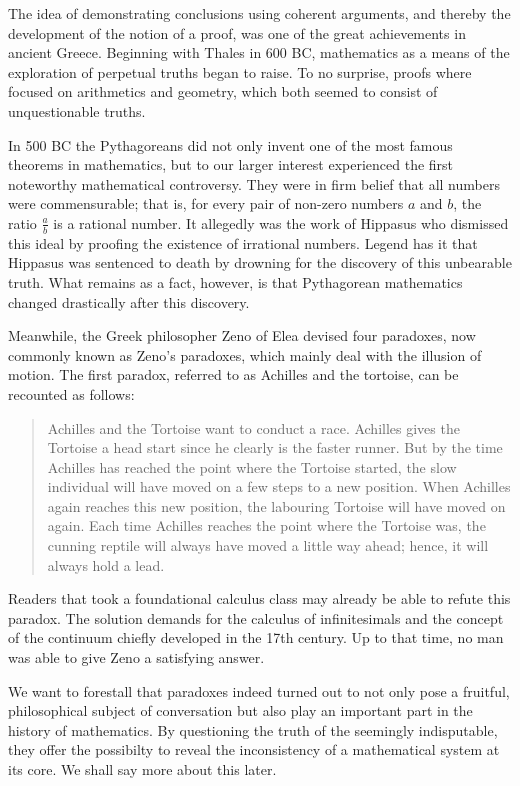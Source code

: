 \documentclass[hidelinks]{article}
\theoremstyle{plain}
\theoremstyle{definition}
\theoremstyle{rem}
\begin{document}
The idea of demonstrating conclusions using coherent arguments, and thereby the development of the notion of a proof, was one of the great achievements in ancient Greece.
Beginning with Thales in 600 BC, mathematics as a means of the exploration of perpetual truths began to raise. To no surprise, proofs where focused on arithmetics and geometry, which both seemed to consist of unquestionable truths.

In 500 BC the Pythagoreans did not only invent one of the most famous theorems in mathematics, but to our larger interest experienced the first noteworthy mathematical controversy. They were in firm belief that all numbers were commensurable; that is, for every pair of non-zero numbers $a$ and $b$, the ratio $\frac{a}{b}$ is a rational number. It allegedly was the work of Hippasus who dismissed this ideal by proofing the existence of irrational numbers. Legend has it that Hippasus was sentenced to death by drowning for the discovery of this unbearable truth. What remains as a fact, however, is that Pythagorean mathematics changed drastically after this discovery.

Meanwhile, the Greek philosopher Zeno of Elea devised four paradoxes, now commonly known as Zeno's paradoxes, which mainly deal with the illusion of motion. The first paradox, referred to as Achilles and the tortoise, can be recounted as follows:
\begin{quote}\label{zeno_paradox}
Achilles and the Tortoise want to conduct a race. Achilles gives the Tortoise a head start since he clearly is the faster runner. But by the time Achilles has reached the point where the Tortoise started, the slow individual will have moved on a few steps to a new position. When Achilles again reaches this new position, the labouring Tortoise will have moved on again. Each time Achilles reaches the point where the Tortoise was, the cunning reptile will always have moved a little way ahead; hence, it will always hold a lead.
\end{quote}
Readers that took a foundational calculus class may already be able to refute this paradox. The solution demands for the calculus of infinitesimals and the concept of the continuum chiefly developed in the 17th century. Up to that time, no man was able to give Zeno a satisfying answer.

We want to forestall that paradoxes indeed turned out to not only pose a fruitful, philosophical subject of conversation but also play an important part in the history of mathematics. By questioning the truth of the seemingly indisputable, they offer the possibilty to reveal the inconsistency of a mathematical system at its core. We shall say more about this later.
\end{document}
